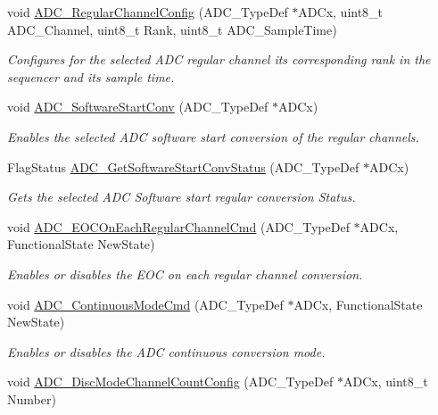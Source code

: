 \begin{DoxyCompactItemize}
void \hyperlink{group___a_d_c_gac531adb577b648d4bb8881f2ed627d52}{A\-D\-C\-\_\-\-Regular\-Channel\-Config} (A\-D\-C\-\_\-\-Type\-Def $\ast$A\-D\-Cx, uint8\-\_\-t A\-D\-C\-\_\-\-Channel, uint8\-\_\-t Rank, uint8\-\_\-t A\-D\-C\-\_\-\-Sample\-Time)
\begin{DoxyCompactList}\small\item\em Configures for the selected A\-D\-C regular channel its corresponding rank in the sequencer and its sample time. \end{DoxyCompactList}\item 
void \hyperlink{group___a_d_c_gac1cd466e725595812c1bbfdad2459ff1}{A\-D\-C\-\_\-\-Software\-Start\-Conv} (A\-D\-C\-\_\-\-Type\-Def $\ast$A\-D\-Cx)
\begin{DoxyCompactList}\small\item\em Enables the selected A\-D\-C software start conversion of the regular channels. \end{DoxyCompactList}\item 
Flag\-Status \hyperlink{group___a_d_c_gaf1119583782ecbcec380efcb7eb74883}{A\-D\-C\-\_\-\-Get\-Software\-Start\-Conv\-Status} (A\-D\-C\-\_\-\-Type\-Def $\ast$A\-D\-Cx)
\begin{DoxyCompactList}\small\item\em Gets the selected A\-D\-C Software start regular conversion Status. \end{DoxyCompactList}\item 
void \hyperlink{group___a_d_c_ga5316caaa170415ef171c486d8f0bf22d}{A\-D\-C\-\_\-\-E\-O\-C\-On\-Each\-Regular\-Channel\-Cmd} (A\-D\-C\-\_\-\-Type\-Def $\ast$A\-D\-Cx, Functional\-State New\-State)
\begin{DoxyCompactList}\small\item\em Enables or disables the E\-O\-C on each regular channel conversion. \end{DoxyCompactList}\item 
void \hyperlink{group___a_d_c_ga879d70e9345d35688590938503f961db}{A\-D\-C\-\_\-\-Continuous\-Mode\-Cmd} (A\-D\-C\-\_\-\-Type\-Def $\ast$A\-D\-Cx, Functional\-State New\-State)
\begin{DoxyCompactList}\small\item\em Enables or disables the A\-D\-C continuous conversion mode. \end{DoxyCompactList}\item 
void \hyperlink{group___a_d_c_ga6eb241ba82d67d1371136c9132083937}{A\-D\-C\-\_\-\-Disc\-Mode\-Channel\-Count\-Config} (A\-D\-C\-\_\-\-Type\-Def $\ast$A\-D\-Cx, uint8\-\_\-t Number)

\end{DoxyCompactItemize}
